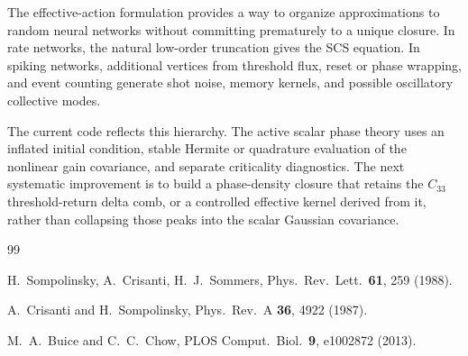 \documentclass[pre,preprint,preprintnumbers,aps,eqsecnum,superscriptaddress,notitlepage,showpacs,floatfix]{revtex4-1}
\begin{document}
The effective-action formulation provides a way to organize approximations to
random neural networks without committing prematurely to a unique closure.  In
rate networks, the natural low-order truncation gives the SCS equation.  In
spiking networks, additional vertices from threshold flux, reset or phase
wrapping, and event counting generate shot noise, memory kernels, and possible
oscillatory collective modes.

The current code reflects this hierarchy.  The active scalar phase theory
uses an inflated initial condition, stable Hermite or quadrature evaluation of the
nonlinear gain covariance, and separate criticality diagnostics.  The next
systematic improvement is to build a phase-density closure that retains the
$C_{33}$ threshold-return delta comb, or a controlled effective kernel derived
from it, rather than collapsing those peaks into the scalar Gaussian
covariance.

\begin{thebibliography}{99}

H.~Sompolinsky, A.~Crisanti, H.~J.~Sommers,
Phys.\ Rev.\ Lett.\ \textbf{61}, 259 (1988).

A.~Crisanti and H.~Sompolinsky,
Phys.\ Rev.\ A \textbf{36}, 4922 (1987).

M.~A.~Buice and C.~C.~Chow,
PLOS Comput.\ Biol.\ \textbf{9}, e1002872 (2013).

\end{thebibliography}
\end{document}
